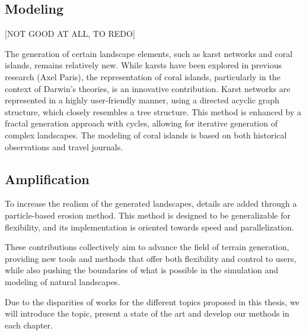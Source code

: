 \subsection{Modeling}

[NOT GOOD AT ALL, TO REDO]

The generation of certain landscape elements, such as karst networks and coral islands, remains relatively new. While karsts have been explored in previous research (Axel Paris), the representation of coral islands, particularly in the context of Darwin's theories, is an innovative contribution. Karst networks are represented in a highly user-friendly manner, using a directed acyclic graph structure, which closely resembles a tree structure. This method is enhanced by a fractal generation approach with cycles, allowing for iterative generation of complex landscapes. The modeling of coral islands is based on both historical observations and travel journals.

\subsection{Amplification}
To increase the realism of the generated landscapes, details are added through a particle-based erosion method. This method is designed to be generalizable for flexibility, and its implementation is oriented towards speed and parallelization. 

These contributions collectively aim to advance the field of terrain generation, providing new tools and methods that offer both flexibility and control to users, while also pushing the boundaries of what is possible in the simulation and modeling of natural landscapes.

Due to the disparities of works for the different topics proposed in this thesis, we will introduce the topic, present a state of the art and develop our methods in each chapter.





